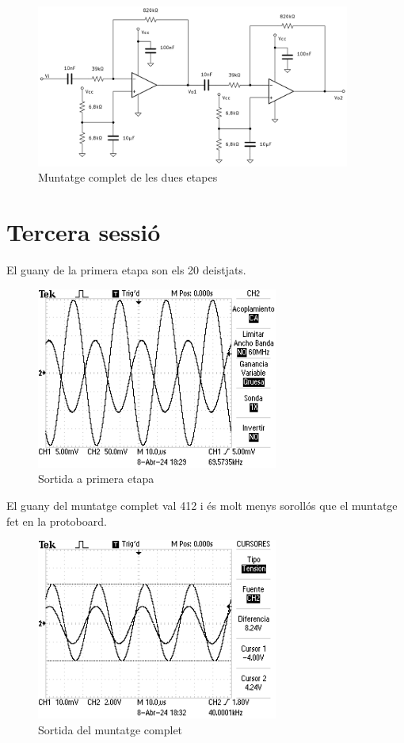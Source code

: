 \documentclass[catalan, a4paper, nobib]{tufte-handout}
\begin{document}
\begin{figure}[!h]
  \begin{center}
    \includegraphics[width=390px]{S2circ.png}
  \end{center}
  \caption{Muntatge complet de les dues etapes}
  \label{fig:f6}
\end{figure}

\newpage

\part{Tercera sessió}

 El guany de la primera etapa son els \num{20} deistjats.

\begin{figure}[h]
  \begin{center}
    \includegraphics[width=300px]{P4S3_2.png}
  \end{center}
  \caption{Sortida a primera etapa}
\end{figure}

 El guany del muntatge complet val \num{412} i és molt menys sorollós que el muntatge fet en la protoboard.

\begin{figure}[h]
  \begin{center}
    \includegraphics[width=300px]{P4S3_1.png}
  \end{center}
  \caption{Sortida del muntatge complet}
\end{figure}


\end{document}
